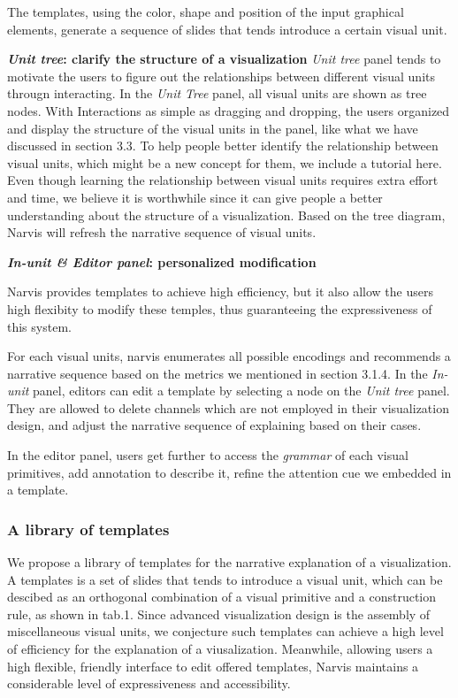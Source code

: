 The templates, using the color, shape and position of the input graphical elements, generate a sequence of slides that tends introduce a certain visual unit.

\textbf{\textit{Unit tree}: clarify the structure of a visualization}
\textit{Unit tree} panel tends to motivate the users to figure out the relationships between different visual units througn interacting.  
In the \textit{Unit Tree} panel, all visual units are shown as tree nodes.
With Interactions as simple as dragging and dropping, the users organized and display the structure of the visual units in the panel, like what we have discussed in section 3.3. To help people better identify the relationship between visual units, which might be a new concept for them, we include a tutorial here. Even though learning the relationship between visual units requires extra effort and time, we believe it is worthwhile since it can give people a better understanding about the structure of a visualization. Based on the tree diagram, Narvis will refresh the narrative sequence of visual units. 

 \textbf{\textit{ In-unit \& Editor panel}: personalized modification}
 
 Narvis provides templates to achieve high efficiency, but it also allow the users high flexibity to modify these temples, thus guaranteeing the expressiveness of this system. 
 
For each visual units, narvis enumerates all possible encodings and recommends a narrative sequence based on the metrics we mentioned in section 3.1.4. In the \textit{In-unit} panel, editors can edit a template by selecting a node on the \textit{Unit tree} panel. They are allowed to delete channels which are not employed in their visualization design,  and adjust the narrative sequence of explaining based on their cases. 
 
In the editor panel, users get further to access the \textit{grammar} of each visual primitives, add annotation to describe it, refine the attention cue we embedded in a template. 

\subsubsection{A library of templates}
We propose a library of templates for the narrative explanation of a visualization. A templates is a set of slides that tends to introduce a visual unit, which can be descibed as an orthogonal combination of a visual primitive and a construction rule, as shown in tab.1. Since advanced visualization design is the assembly of miscellaneous visual units, we conjecture such templates can achieve a high level of efficiency for the explanation of a viusalization. Meanwhile, allowing users a high flexible, friendly interface to edit offered templates, Narvis maintains a considerable level of expressiveness and accessibility. 

